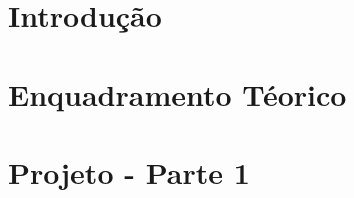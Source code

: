 \documentclass[a4paper,twoside,11pt]{article}
\begin{document}
    

    \section{Introdução}\label{sec:introduction}
    

    \section{Enquadramento Téorico}\label{sec:theoretical_context}
    

    \section{Projeto - Parte 1}\label{sec:project_part1}
    

    
    
\end{document}
